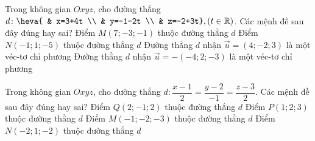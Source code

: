 \begin{ex}%
	Trong không gian $Oxyz$, cho đường thẳng $d\colon \heva{
		& x=3+4t \\ 
		& y=-1-2t \\ 
		& z=-2+3t},( t\in \mathbb{R})$. Các mệnh đề sau đây đúng hay sai?
	\choiceTF
	{ Điểm $M\left( 7;-3;-1 \right)$ thuộc đường thẳng $d$}
	{ \True Điểm $N\left( -1;1;-5 \right)$ thuộc đường thẳng $d$}
	{\True  Đường thẳng $d$ nhận $\overrightarrow{u}=\left( 4;-2;3 \right)$ là một véc-tơ chỉ phương}
	{\True  Đường thẳng $d$ nhận $\overrightarrow{u}=-\left( -4;2;-3 \right)$ là một véc-tơ chỉ phương}
\end{ex}
\begin{ex}%
Trong không gian $Oxyz$, cho đường thẳng $d \colon \dfrac{x-1}{2}=\dfrac{y-2}{-1}=\dfrac{z-3}{2}$. Các mệnh đề sau đây đúng hay sai?
	\choiceTF
	{ Điểm $Q\left( 2;-1;2 \right)$ thuộc đường thẳng $d$}
	{ \True Điểm $P\left( 1;2;3 \right)$ thuộc đường thẳng $d$}
	{ Điểm $M\left( -1;-2;-3 \right)$ thuộc đường thẳng $d$}
	{ Điểm $N\left( -2;1;-2 \right)$ thuộc đường thẳng $d$}
\end{ex}
